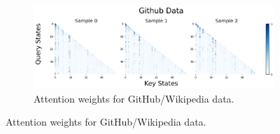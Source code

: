 \begin{figure}
    \centering
    \begin{subfigure}[t]{0.5\textwidth}
        \centering
        \caption{\small Attention weights for GitHub/Wikipedia data.}%
        \includegraphics[width=\textwidth]{Figures/L16_H25/attn_weights_l16h25_github_revised.png}
        

\end{subfigure}
\end{figure}
